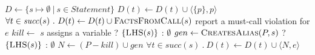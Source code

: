 \begin{algorithm}[t]
{    %
  }
  \label{alg:consistency-checker}
  \begin{algorithmic}[1]
  \State $D \gets \{ s \mapsto \emptyset\ |\ s \in \mathit{Statement} \}$\label{li:start-init}
  \label{li:init-formals}
      \State $D(t) \gets D(t) \cup \langle \{p\}, p \rangle$
    \EndIf
  \EndFor \label{li:end-init-formals}
   \label{li:init-calls}
    \State $\forall t \in \mathit{succ}(s)\ .\ D(t) \leftarrow D(t) \cup \textsc{FactsFromCall}(s)$
  \EndFor  \label{li:end-init}
     \label{li:end-scope}
      \State report a must-call violation for $e$
     \label{li:check-satisfied}
    \State $kill \gets $ $s$ assigns a variable ? $\{\textsc{LHS}(s)\}$ : $\emptyset$ \label{li:compute-kill}
    \State $gen \gets \textsc{CreatesAlias}(P,s)$ ? $\{\textsc{LHS}(s)\}$ : $\emptyset$ \label{li:compute-gen} 
    \State $N \gets (P - kill) \cup gen$ \label{li:compute-new-mc-aliases}
    \State $\forall t \in \mathit{succ}(s)\ .\ D(t) \leftarrow D(t) \cup \langle
    N, e \rangle$ \label{li:prop-to-succs}
    \EndIf
    \EndFor
  \EndWhile \label{li:alg-loop-end}
  \EndProcedure
  \end{algorithmic}
\end{algorithm}

